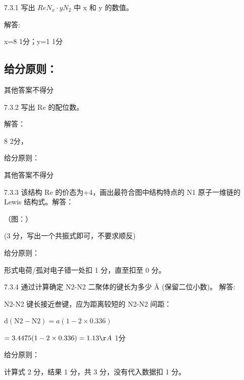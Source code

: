 7.3.1 写出 $ReN_{x} \cdot yN_{2}$ 中 x 和 y 的数值。

解答:

x=8 1分；y=1 1分

\subsection*{给分原则：}

其他答案不得分

7.3.2 写出 Re 的配位数。

解答：

8 2分，

给分原则：

其他答案不得分

7.3.3 该结构 Re 的价态为+4，画出最符合图中结构特点的 N1 原子一维链的 Lewis 结构式。解答：

（图：）

(3 分，写出一个共振式即可，不要求顺反)

给分原则：

形式电荷/孤对电子错一处扣 1 分，直至扣至 0 分。

7.3.4 通过计算确定 N2-N2 二聚体的键长为多少 Å (保留二位小数)。
解答:

N2-N2 键长接近叁键，应为距离较短的 N2-N2 间距：

$
\mathrm{d} (\mathrm{N} 2 - \mathrm{N} 2) = a (1 - 2 \times 0. 3 3 6)
$

$= 3.4475(1 - 2\times 0.336) = 1.13\AA$ 1分

给分原则：

计算式 2 分，结果 1 分，共 3 分，没有代入数据扣 1 分。

